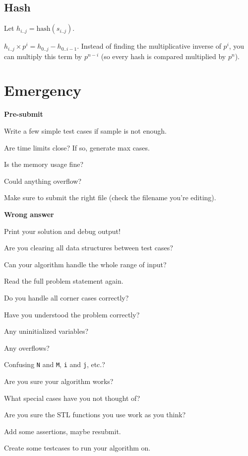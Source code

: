 \documentclass[a4paper]{article}
\begin{document}
\subsection{Hash}
Let $h_{i..j} = \textrm{hash}(s_{i..j})$.

$h_{i..j}\times p^i = h_{0..j} - h_{0..i-1}$. Instead of finding the multiplicative inverse of $p^i$, you can multiply this term by $p^{n-i}$ (so every hash is compared multiplied by $p^n$).

\section{Emergency}
\noindent
\textbf{Pre-submit}

\noindent
Write a few simple test cases if sample is not enough.

\noindent
Are time limits close? If so, generate max cases.

\noindent
Is the memory usage fine?

\noindent
Could anything overflow?

\noindent
Make sure to submit the right file (check the filename you're editing).

\noindent
\textbf{Wrong answer}

\noindent
Print your solution and debug output!

\noindent
Are you clearing all data structures between test cases?

\noindent
Can your algorithm handle the whole range of input?

\noindent
Read the full problem statement again.

\noindent
Do you handle all corner cases correctly?

\noindent
Have you understood the problem correctly?

\noindent
Any uninitialized variables?

\noindent
Any overflows?

\noindent
Confusing \texttt{N} and \texttt{M}, \texttt{i} and \texttt{j}, etc.?

\noindent
Are you sure your algorithm works?

\noindent
What special cases have you not thought of?

\noindent
Are you sure the STL functions you use work as you think?

\noindent
Add some assertions, maybe resubmit.

\noindent
Create some testcases to run your algorithm on.
\end{document}
